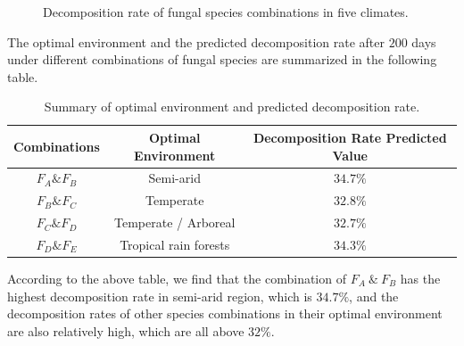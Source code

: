 \begin{figure}[H]
  \centering
\end{figure}
\begin{figure}[H]
  \centering
  \caption{Decomposition rate of fungal species combinations in five climates.}
\end{figure}
\par
The optimal environment and the predicted decomposition rate after $200$ days under different combinations of fungal species are summarized in the following table.
\begin{table}[H]
  \centering
  \caption{Summary of optimal environment and predicted decomposition rate.}
  \label{summaryofenvironmentandprediction}
  \begin{tabular*}{\hsize}{@{\extracolsep{\fill}}ccc}
    \toprule
    Combinations & Optimal Environment & Decomposition Rate Predicted Value \\
    \midrule
    $F_A\&F_B$ & Semi-arid & $34.7\%$ \\
    $F_B\&F_C$ & Temperate & $32.8\%$ \\
    $F_C\&F_D$ & Temperate / Arboreal & $32.7\%$ \\
    $F_D\&F_E$ & Tropical rain forests & $34.3\%$ \\
    \bottomrule
  \end{tabular*}
\end{table}
According to the above table, we find that the combination of $F_A\ \&\ F_B$ has the highest decomposition rate in semi-arid region, which is $34.7\%$, and the decomposition rates of other species combinations in their optimal environment are also relatively high, which are all above $32\%$.